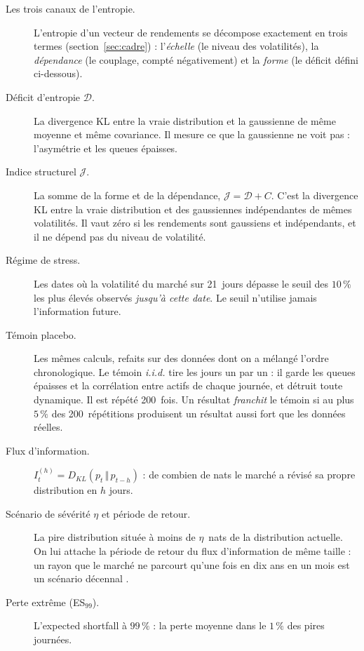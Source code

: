 \documentclass[11pt]{article}
\theoremstyle{definition}
\newcommand{\JJ}{\mathcal{J}}
\newcommand{\DD}{\mathcal{D}}
\newcommand{\KL}[2]{D_{KL}\!\left(#1\,\Vert\,#2\right)}
\begin{document}
\begin{description}
\item[Les trois canaux de l'entropie.] L'entropie d'un vecteur de rendements se
décompose exactement en trois termes (section~\ref{sec:cadre}) :
l'\emph{échelle} (le niveau des volatilités), la \emph{dépendance} (le
couplage, compté négativement) et la \emph{forme} (le déficit défini
ci-dessous).

\item[Déficit d'entropie $\DD$.] La divergence KL entre la vraie distribution
et la gaussienne de même moyenne et même covariance. Il mesure ce que la
gaussienne ne voit pas : l'asymétrie et les queues épaisses.

\item[Indice structurel $\JJ$.] La somme de la forme et de la dépendance,
$\JJ=\DD+C$. C'est la divergence KL entre la vraie distribution et des
gaussiennes indépendantes de mêmes volatilités. Il vaut zéro si les rendements
sont gaussiens et indépendants, et il ne dépend pas du niveau de volatilité.

\item[Régime de stress.] Les dates où la volatilité du marché sur 21~jours
dépasse le seuil des $10\,\%$ les plus élevés observés \emph{jusqu'à cette
date}. Le seuil n'utilise jamais l'information future.

\item[Témoin placebo.] Les mêmes calculs, refaits sur des données dont on a
mélangé l'ordre chronologique. Le témoin \emph{i.i.d.} tire les jours un par
un : il garde les queues épaisses et la corrélation entre actifs de chaque
journée, et détruit toute dynamique. Il est répété 200~fois. Un résultat
\emph{franchit} le témoin si au plus $5\,\%$ des 200~répétitions produisent un
résultat aussi fort que les données réelles.

\item[Flux d'information.] $I^{(h)}_t=\KL{p_t}{p_{t-h}}$ : de combien de nats
le marché a révisé sa propre distribution en $h$ jours.

\item[Scénario de sévérité $\eta$ et période de retour.] La pire distribution
située à moins de $\eta$~nats de la distribution actuelle. On lui attache la
période de retour du flux d'information de même taille : un rayon que le
marché ne parcourt qu'une fois en dix ans en un mois est un scénario
\og décennal \fg.

\item[Perte extrême (ES$_{99}$).] L'expected shortfall à $99\,\%$ : la perte
moyenne dans le $1\,\%$ des pires journées.
\end{description}
\end{document}
